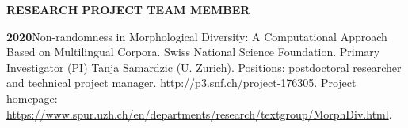 \documentclass[11pt]{article}
\newcommand{\hangpara}{
 \setlength{\parindent}{0in} %
 \hangindent=0.42in %
}
\begin{document}
\begin{comment}
\vskip 20pt
\begin{flushleft}
{\bf ADVISING}
\end{flushleft}

\hangpara
{\bf 2021}\hspace{1ex}Klaas Seinhorst, PhD. \href{https://www.fon.hum.uva.nl/klaas/KlaasSeinhorstDissertation.pdf}{The complexity and learnability of phonological patterns: simulations, experiments, typology}. PhD thesis committee. University of Amsterdam.

\hangpara
\vskip 6pt
{\bf 2020}\hspace{1ex}Elad Eisan. \href{https://www.researchgate.net/publication/341734023_The_Typology_of_Phonological_Segment_Borrowing}{
The Typology of Phonological Segment Borrowing}. M.A.\ thesis committee. Department of Linguistics, The Hebrew University of Jerusalem.

\hangpara
\vskip 6pt
{\bf 2019}\hspace{1ex}Cazim Hysi. Implementing Diachronic Language Simulation in Python. B.A.\ thesis committee. Department of Computational Linguistics, University of Zurich.

\hangpara
\vskip 6pt
{\bf 2016}\hspace{1ex}Danica Pajovi{\v c}. ACQDIVIZ: Visualising Development in Longitudinal First Language Acquisition Data. M.A.\ thesis committee. Department of Computational Linguistics, University of Zurich.

\vskip 6pt
\hangpara
{\bf 2015}\hspace{1ex}Melanie Widmer. Die Rolle distributioneller Information im Spracherwerb: Kategorisierung mit Hilfe von h{\"a}ufigen Frames. B.A.\ thesis committee. Department of Comparative Linguistics, University of Zurich.
\end{comment}

\vskip 20pt
\begin{flushleft}
{\bf RESEARCH PROJECT TEAM MEMBER}
\end{flushleft}

\hangpara
{\bf 2020}\hspace{1ex}Non-randomness in Morphological Diversity: A Computational Approach Based on Multilingual Corpora. Swiss National Science Foundation. Primary Investigator (PI) Tanja Samardzic (U. Zurich). Positions: postdoctoral researcher and technical project manager. \url{http://p3.snf.ch/project-176305}. Project homepage: \url{https://www.spur.uzh.ch/en/departments/research/textgroup/MorphDiv.html}.
\end{document}

